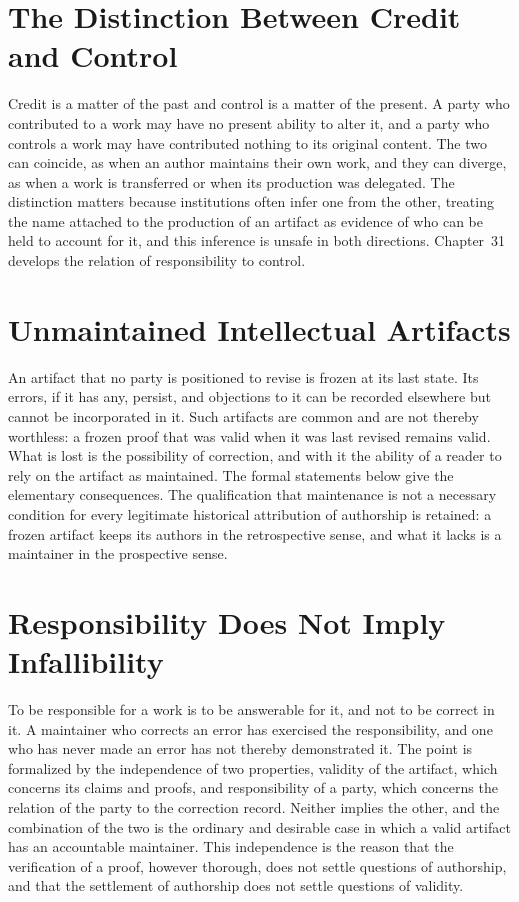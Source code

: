 \documentclass[11pt,letterpaper]{report}
\theoremstyle{plain}
\theoremstyle{definition}
\theoremstyle{remark}
\begin{document}
\section{The Distinction Between Credit and Control}

Credit is a matter of the past and control is a matter of the present. A party who contributed to a work may have no present ability to alter it, and a party who controls a work may have contributed nothing to its original content. The two can coincide, as when an author maintains their own work, and they can diverge, as when a work is transferred or when its production was delegated. The distinction matters because institutions often infer one from the other, treating the name attached to the production of an artifact as evidence of who can be held to account for it, and this inference is unsafe in both directions. Chapter~31 develops the relation of responsibility to control.

\section{Unmaintained Intellectual Artifacts}

An artifact that no party is positioned to revise is frozen at its last state. Its errors, if it has any, persist, and objections to it can be recorded elsewhere but cannot be incorporated in it. Such artifacts are common and are not thereby worthless: a frozen proof that was valid when it was last revised remains valid. What is lost is the possibility of correction, and with it the ability of a reader to rely on the artifact as maintained. The formal statements below give the elementary consequences. The qualification that maintenance is not a necessary condition for every legitimate historical attribution of authorship is retained: a frozen artifact keeps its authors in the retrospective sense, and what it lacks is a maintainer in the prospective sense.

\section{Responsibility Does Not Imply Infallibility}

To be responsible for a work is to be answerable for it, and not to be correct in it. A maintainer who corrects an error has exercised the responsibility, and one who has never made an error has not thereby demonstrated it. The point is formalized by the independence of two properties, validity of the artifact, which concerns its claims and proofs, and responsibility of a party, which concerns the relation of the party to the correction record. Neither implies the other, and the combination of the two is the ordinary and desirable case in which a valid artifact has an accountable maintainer. This independence is the reason that the verification of a proof, however thorough, does not settle questions of authorship, and that the settlement of authorship does not settle questions of validity.
\end{document}
